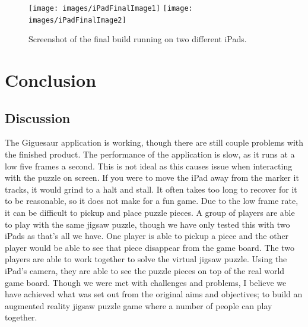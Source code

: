 \documentclass{article}
\begin{document}
\begin{figure}[ht]
\begin{center}
\centerline{
\texttt{[image: images/iPadFinalImage1]}
\texttt{[image: images/iPadFinalImage2]}
}
\caption{Screenshot of the final build running on two different iPads.}
\label{fig:iPadFinal}
\end{center}
\end{figure}


\section{Conclusion}

\subsection{Discussion}
The Giguesaur application is working, though there are still couple problems
with the finished product. The performance of the application is slow, as it
runs at a low five frames a second. This is not ideal as this causes issue when
interacting with the puzzle on screen. If you were to move the iPad away from
the marker it tracks, it would grind to a halt and stall. It often takes too
long to recover for it to be reasonable, so it does not make for a fun game. Due
to the low frame rate, it can be difficult to pickup and place puzzle pieces. A
group of players are able to play with the same jigsaw puzzle, though we have
only tested this with two iPads as that's all we have. One player is able to
pickup a piece and the other player would be able to see that piece disappear
from the game board. The two players are able to work together to solve the
virtual jigsaw puzzle. Using the iPad's camera, they are able to see the puzzle
pieces on top of the real world game board. Though we were met with challenges
and problems, I believe we have achieved what was set out from the original aims
and objectives; to build an augmented reality jigsaw puzzle game where a number
of people can play together. 
\end{document}
